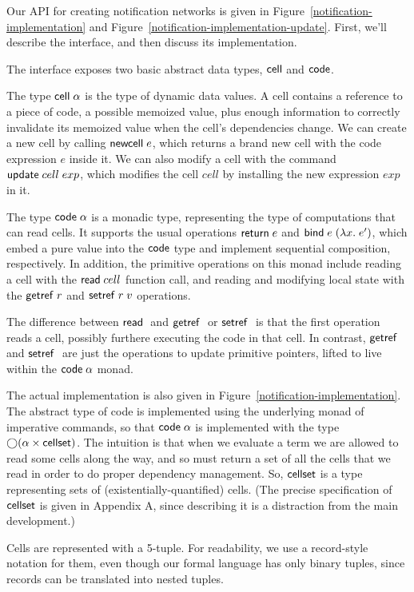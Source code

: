 Our API for creating notification networks is given in
Figure~\ref{notification-implementation} and
Figure~\ref{notification-implementation-update}. First, we'll describe
the interface, and then discuss its implementation.

The interface exposes two basic abstract data types, $\mathsf{cell}$
and $\mathsf{code}$.

The type $\mathsf{cell}\;{\alpha}$ is the type of dynamic data values. A cell
contains a reference to a piece of code, a possible memoized value,
plus enough information to correctly invalidate its memoized value
when the cell's dependencies change. We can create a new cell by
calling $\mathsf{newcell}\; e$, which returns a brand new cell with the
code expression $e$ inside it. We can also modify a cell with 
the command $\mathsf{update}\;cell\;exp$, which modifies the cell
$cell$ by installing the new expression $exp$ in it. 

The type $\mathsf{code}\;{\alpha}$ is a monadic type, representing the type of
computations that can read cells. It supports the usual operations
$\mathsf{return}\; e$ and $\mathsf{bind}\; e\; (\lambda x.\;e')$, which embed a pure value
into the $\mathsf{code}$ type and implement sequential composition,
respectively. In addition, the primitive operations on this monad
include reading a cell with the $\mathsf{read}\; cell$ function call, and
reading and modifying local state with the $\mathsf{getref}\; r$ and $\mathsf{setref}\;
r\;v$ operations.

The difference between $\mathsf{read}\;$ and $\mathsf{getref}\;$ or $\mathsf{setref}\;$ is that
the first operation reads a cell, possibly furthere executing the code
in that cell. In contrast, $\mathsf{getref}\;$ and $\mathsf{setref}\;$ are just the
operations to update primitive pointers, lifted to live within the
$\mathsf{code}\;{\alpha}$ monad.
 
The actual implementation is also given in
Figure~\ref{notification-implementation}. The abstract type of code is
implemented using the underlying monad of imperative commands, so that
$\mathsf{code}\;{\alpha}$ is implemented with the type $\bigcirc{(\alpha
  \times \mathsf{cellset})}$.  The intuition is that when we evaluate a term
we are allowed to read some cells along the way, and so must return a
set of all the cells that we read in order to do proper dependency
management. So, $\mathsf{cellset}$ is a type representing sets of
(existentially-quantified) cells.  (The precise specification of
$\mathsf{cellset}$ is given in Appendix A, since describing it is a
distraction from the main development.)

Cells are represented with a 5-tuple. For readability, we use a
record-style notation for them, even though our formal language has
only binary tuples, since records can be translated into nested
tuples.

